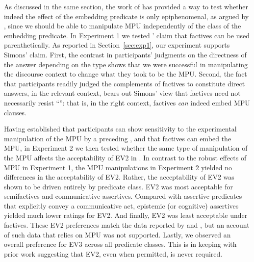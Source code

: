 \documentclass[output=paper]{langsci/langscibook}
\begin{document}
As discussed in the same section, the work of \citet{Simons2007} has provided a way to 
test whether indeed the effect of the embedding predicate is only epiphenomenal, as argued by \citeauthor{JensenChristensen2013}, since we should be able to manipulate MPU independently of the class of the embedding predicate. 
In Experiment 1 we tested \citeauthor{Simons2007}' claim that factives can be used parenthetically.  As reported in Section~\ref{sec:exp1}, our experiment supports Simons' claim.   First, the contrast in participants' judgments on the directness of the answer depending on the  type shows that we were successful in manipulating the discourse context to change what they took to be the MPU. Second, the fact that participants readily judged the complements of factives to constitute direct answers, in the relevant context, bears out Simons' view that factives need not necessarily resist ``'': that is, in the right context, factives \textit{can} indeed embed MPU clauses.

Having established that participants can show sensitivity to the experimental manipulation of the MPU by a preceding , and that factives can embed the MPU, in Experiment 2 we then tested whether the same type of manipulation of the MPU affects the acceptability of EV2 in . 
 In contrast to the robust effects of MPU in Experiment 1, the MPU manipulations in Experiment 2 yielded no differences in the acceptability of EV2.  Rather, the acceptability of EV2 was shown to be driven entirely by predicate class.  EV2 was most acceptable for semifactives and communicative assertives.  Compared with assertive predicates that explicitly convey a communicative act, epistemic (or cognitive) assertives yielded much lower ratings for EV2.  And finally, EV2 was least acceptable under factives.  These EV2 preferences match the data reported by \citeauthor{JensenChristensen2013} and \citeauthor{WiklundEtAl2009}, but an account of such data that relies on MPU was not supported.  Lastly, we observed an overall preference for EV3 across all predicate classes. This is in keeping with prior work suggesting that EV2, even when permitted, is never required. 
\end{document}
